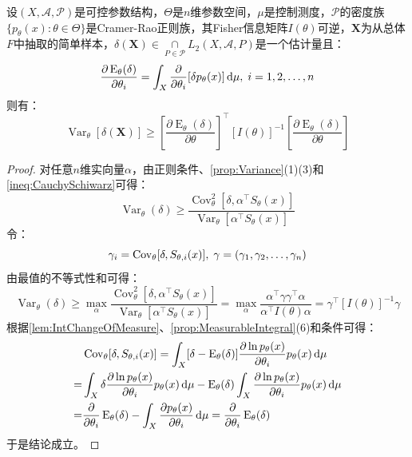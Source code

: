 \begin{theorem}\label{theo:InformationInequalityn}
	设$(X,\mathscr{A},\mathscr{P})$是可控参数结构，$\Theta$是$n$维参数空间，$\mu$是控制测度，$\mathscr{P}$的密度族$\{p_{\theta}(x):\theta\in\Theta\}$是Cramer-Rao正则族，其Fisher信息矩阵$I(\theta)$可逆，$\mathbf{X}$为从总体$F$中抽取的简单样本，$\delta(\mathbf{X})\in\underset{P\in\mathscr{P}}{\cap}L_2(X,\mathscr{A},P)$是一个估计量且：
	\begin{equation*}
		\frac{\partial\operatorname{E}_{\theta}(\delta)}{\partial\theta_i}=\int_{X}\frac{\partial}{\partial\theta_i}[\delta p_{\theta}(x)]\mathop{}\!\mathrm{d}\mu,\;i=1,2,\dots,n
	\end{equation*}
	则有：
	\begin{equation*}
		\operatorname{Var}_{\theta}[\delta(\mathbf{X})]\geqslant\left[\frac{\partial\operatorname{E}_{\theta}(\delta)}{\partial\theta}\right]^{\top}[I(\theta)]^{-1}\left[\frac{\partial\operatorname{E}_{\theta}(\delta)}{\partial\theta}\right]
	\end{equation*}
\end{theorem}
\begin{proof}
	对任意$n$维实向量$\alpha$，由正则条件、\cref{prop:Variance}(1)(3)和\cref{ineq:CauchySchiwarz}可得：
	\begin{equation*}
		\operatorname{Var}_{\theta}(\delta)\geqslant\frac{\operatorname{Cov}_{\theta}^2[\delta,\alpha^{\top}S_{\theta}(x)]}{\operatorname{Var}_{\theta}[\alpha^{\top}S_{\theta}(x)]}
	\end{equation*}
	令：
	\begin{equation*}
		\gamma_i=\operatorname{Cov}_{\theta}[\delta,S_{\theta,i}(x)],\;\gamma=(\gamma_1, \gamma_2, \dots, \gamma_{n})
	\end{equation*}
	由最值的不等式性和可得：
	\begin{equation*}
		\operatorname{Var}_{\theta}(\delta)\geqslant\max_{\alpha}\frac{\operatorname{Cov}_{\theta}^2[\delta,\alpha^{\top}S_{\theta}(x)]}{\operatorname{Var}_{\theta}[\alpha^{\top}S_{\theta}(x)]}=\max_{\alpha}\frac{\alpha^{\top}\gamma\gamma^{\top}\alpha}{\alpha^{\top}I(\theta)\alpha}=\gamma^{\top}[I(\theta)]^{-1}\gamma
	\end{equation*}
	根据\cref{lem:IntChangeOfMeasure}、\cref{prop:MeasurableIntegral}(6)和条件可得：
	\begin{align*}
		&\operatorname{Cov}_{\theta}[\delta,S_{\theta,i}(x)]=\int_{X}[\delta-\operatorname{E}_{\theta}(\delta)]\frac{\partial\ln p_{\theta}(x)}{\partial\theta_i}p_{\theta}(x)\mathop{}\!\mathrm{d}\mu \\
		=&\int_{X}\delta\frac{\partial\ln p_{\theta}(x)}{\partial\theta_i}p_{\theta}(x)\mathop{}\!\mathrm{d}\mu-\operatorname{E}_{\theta}(\delta)\int_{X}\frac{\partial\ln p_{\theta}(x)}{\partial\theta_i}p_{\theta}(x)\mathop{}\!\mathrm{d}\mu \\
		=&\frac{\partial}{\partial\theta_i}\operatorname{E}_{\theta}(\delta)-\int_{X}\frac{\partial p_{\theta}(x)}{\partial\theta_i}\mathop{}\!\mathrm{d}\mu=\frac{\partial}{\partial\theta_i}\operatorname{E}_{\theta}(\delta)
	\end{align*}
	于是结论成立。
\end{proof}
